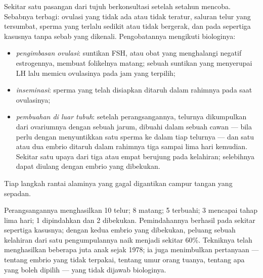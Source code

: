 \begin{proposition}\label{prop:g11:hormones-and-reproduction:art}
Sekitar satu pasangan dari tujuh berkonsultasi setelah setahun mencoba.
Sebabnya terbagi: ovulasi yang tidak ada atau tidak teratur, saluran
telur yang tersumbat, sperma yang terlalu sedikit atau tidak bergerak,
dan pada sepertiga kasusnya tanpa sebab yang dikenali. Pengobatannya
mengikuti biologinya:
\begin{itemize}
  \item \emph{pengimbasan ovulasi}: suntikan FSH, atau obat yang
        menghalangi  negatif estrogennya, membuat folikelnya
        matang; sebuah suntikan yang menyerupai LH lalu memicu
        ovulasinya pada jam yang terpilih;
  \item \emph{inseminasi}: sperma yang telah disiapkan ditaruh dalam
        rahimnya pada saat ovulasinya;
  \item \emph{pembuahan di luar tubuh}: setelah perangsangannya, 
        telurnya dikumpulkan dari ovariumnya dengan sebuah jarum,
        dibuahi dalam sebuah cawan --- bila perlu dengan menyuntikkan
        satu sperma ke dalam tiap  telurnya --- dan satu atau dua
        embrio ditaruh dalam rahimnya tiga sampai lima hari kemudian.
        Sekitar satu upaya dari tiga atau empat berujung pada kelahiran;
        selebihnya dapat diulang dengan embrio yang dibekukan.
\end{itemize}
Tiap langkah rantai alaminya yang gagal digantikan campur tangan yang
sepadan.
\end{proposition}
\admitted

\begin{example}\label{ex:g11:hormones-and-reproduction:ivf}
Perangsangannya menghasilkan 10  telur; 8 matang; 5 terbuahi; 3
mencapai tahap lima hari; 1 dipindahkan dan 2 dibekukan.
Pemindahannya berhasil pada sekitar sepertiga kasusnya; dengan kedua
embrio yang dibekukan, peluang sebuah kelahiran dari satu pengumpulannya
naik menjadi sekitar 60\%. Tekniknya telah menghasilkan beberapa juta
anak sejak 1978; ia juga menimbulkan pertanyaan --- tentang embrio yang
tidak terpakai, tentang umur orang tuanya, tentang apa yang boleh
dipilih --- yang tidak dijawab biologinya.
\end{example}

